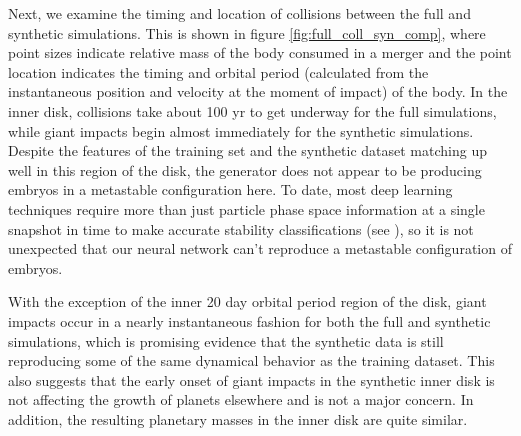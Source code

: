 Next, we examine the timing and location of collisions between the full and synthetic simulations. This is shown in figure \ref{fig:full_coll_syn_comp}, where point sizes indicate relative mass of the body consumed in a merger and the point location indicates the timing and orbital period (calculated from the instantaneous position and velocity at the moment of impact) of the body. In the inner disk, collisions take about 100 yr to get underway for the full simulations, while giant impacts begin almost immediately for the synthetic simulations. Despite the features of the training set and the synthetic dataset matching up well in this region of the disk, the generator does not appear to be producing embryos in a metastable configuration here. To date, most deep learning techniques require more than just particle phase space information at a single snapshot in time to make accurate stability classifications (see \cite{tamayo20, cranmer21}), so it is not unexpected that our neural network can't reproduce a metastable configuration of embryos.

With the exception of the inner 20 day orbital period region of the disk, giant impacts occur in a nearly instantaneous fashion for both the full and synthetic simulations, which is promising evidence that the synthetic data is still reproducing some of the same dynamical behavior as the training dataset. This also suggests that the early onset of giant impacts in the synthetic inner disk is not affecting the growth of planets elsewhere and is not a major concern. In addition, the resulting planetary masses in the inner disk are quite similar.

